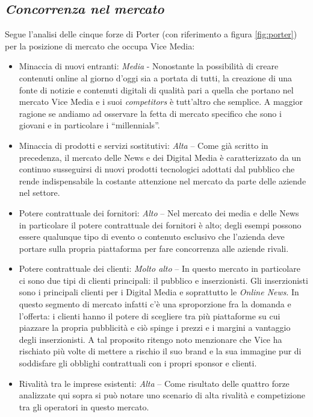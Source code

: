 \documentclass[a4paper, 11pt]{article}
\begin{document}
\subsection*{\textit{Concorrenza nel mercato}}
\par Segue l'analisi delle cinque forze di Porter (con riferimento a figura \ref{fig:porter}) per la posizione di mercato che occupa Vice Media:
\begin{itemize}
\item  Minaccia di nuovi entranti: \textit{Media} - Nonostante la possibilità di creare contenuti online al giorno d’oggi sia a portata di tutti, la creazione di una fonte di notizie e contenuti digitali di qualità pari a quella che portano nel mercato Vice Media e i suoi \textit{competitors} è tutt’altro che semplice.  A maggior ragione se andiamo ad osservare la fetta di mercato specifico che sono i giovani e in particolare i “millennials”.
\item Minaccia di prodotti e servizi sostitutivi: \textit{Alta} – Come già scritto in precedenza, il mercato delle News e dei Digital Media è caratterizzato da un continuo susseguirsi di nuovi prodotti tecnologici adottati dal pubblico che rende indispensabile la costante attenzione nel mercato da parte delle aziende nel settore.
\item Potere contrattuale dei fornitori: \textit{Alto} – Nel mercato dei media e delle News in particolare il potere contrattuale dei fornitori è alto; degli esempi possono essere qualunque tipo di evento o contenuto esclusivo  che l’azienda deve portare sulla propria piattaforma per fare concorrenza alle aziende rivali.
\item Potere contrattuale dei clienti: \textit{Molto alto} – In questo mercato in particolare ci sono due tipi di clienti principali: il pubblico e inserzionisti. Gli inserzionisti sono i principali clienti per i Digital Media e soprattutto le \textit{Online News}. In questo segmento di mercato infatti c’è una sproporzione fra la domanda e l’offerta: i clienti hanno il potere di scegliere tra più piattaforme su cui piazzare la propria pubblicità e ciò spinge i prezzi e i margini a vantaggio degli inserzionisti. A tal proposito ritengo noto menzionare che Vice ha rischiato più volte di mettere a rischio il suo brand e la sua immagine pur di soddisfare gli obblighi contrattuali con i propri sponsor e clienti.
\item Rivalità tra le imprese esistenti: \textit{Alta} – Come risultato delle quattro forze analizzate qui sopra si può notare uno scenario di alta rivalità e competizione tra gli operatori in questo mercato.
\end{itemize}
\end{document}
